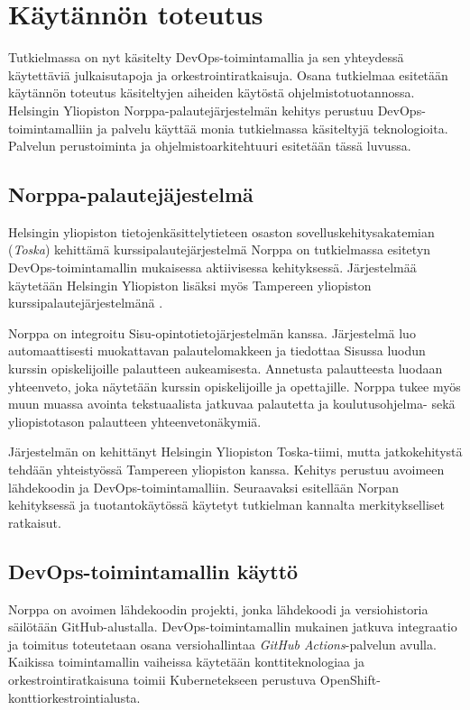\chapter{Käytännön toteutus\label{example}}

Tutkielmassa on nyt käsitelty DevOps-toimintamallia ja sen yhteydessä käytettäviä julkaisutapoja ja orkestrointiratkaisuja.
Osana tutkielmaa esitetään käytännön toteutus käsiteltyjen aiheiden käytöstä ohjelmistotuotannossa.
Helsingin Yliopiston Norppa-palautejärjestelmän kehitys perustuu DevOps-toimintamalliin ja palvelu käyttää monia tutkielmassa käsiteltyjä teknologioita.
Palvelun perustoiminta ja ohjelmistoarkitehtuuri esitetään tässä luvussa.

\section{Norppa-palautejäjestelmä}

Helsingin yliopiston tietojenkäsittelytieteen osaston sovelluskehitysakatemian (\textit{Toska}) \cite{Tenhunen23} kehittämä kurssipalautejärjestelmä Norppa on tutkielmassa esitetyn DevOps-toimintamallin mukaisessa aktiivisessa kehityksessä.
Järjestelmää käytetään Helsingin Yliopiston lisäksi myös Tampereen yliopiston kurssipalautejärjestelmänä \cite{Tampere23}.

Norppa on integroitu Sisu-opintotietojärjestelmän kanssa.
Järjestelmä luo automaattisesti muokattavan palautelomakkeen ja tiedottaa Sisussa luodun kurssin opiskelijoille palautteen aukeamisesta.
Annetusta palautteesta luodaan yhteenveto, joka näytetään kurssin opiskelijoille ja opettajille.
Norppa tukee myös muun muassa avointa tekstuaalista jatkuvaa palautetta ja koulutusohjelma- sekä yliopistotason palautteen yhteenvetonäkymiä.

Järjestelmän on kehittänyt Helsingin Yliopiston Toska-tiimi, mutta jatkokehitystä tehdään yhteistyössä Tampereen yliopiston kanssa.
Kehitys perustuu avoimeen lähdekoodin ja DevOps-toimintamalliin.
Seuraavaksi esitellään Norpan kehityksessä ja tuotantokäytössä käytetyt tutkielman kannalta merkitykselliset ratkaisut.

\section{DevOps-toimintamallin käyttö}

Norppa on avoimen lähdekoodin projekti, jonka lähdekoodi ja versiohistoria säilötään GitHub-alustalla.
DevOps-toimintamallin mukainen jatkuva integraatio ja toimitus toteutetaan osana versiohallintaa \textit{GitHub Actions}-palvelun avulla.
Kaikissa toimintamallin vaiheissa käytetään konttiteknologiaa ja orkestrointiratkaisuna toimii Kubernetekseen perustuva OpenShift-konttiorkestrointialusta.

